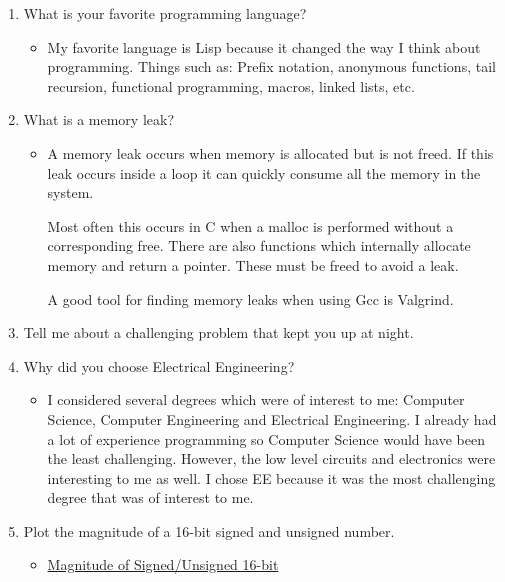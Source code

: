 \documentclass{article}
\begin{document}
\begin{enumerate}

\item What is your favorite programming language?
	\begin{itemize}
	\item My favorite language is Lisp because it changed the way I
		think about programming.  Things such as: Prefix notation,
		anonymous functions, tail recursion, functional programming,
		macros, linked lists, etc.
	\end{itemize}

\item What is a memory leak?
	\begin{itemize}
	\item A memory leak occurs when memory is allocated but is not
		freed.  If this leak occurs inside a loop it can quickly consume
		all the memory in the system.

		Most often this occurs in C when a malloc is performed without a
		corresponding free.  There are also functions which internally
		allocate memory and return a pointer.  These must be freed to
		avoid a leak.

  		A good tool for finding memory leaks when using Gcc is Valgrind.
	\end{itemize}

\item Tell me about a challenging problem that kept you up at night.

\item Why did you choose Electrical Engineering?
	\begin{itemize}
	\item I considered several degrees which were of interest to me:
		Computer Science, Computer Engineering and Electrical
		Engineering.  I already had a lot of experience programming so
		Computer Science would have been the least challenging.
		However, the low level circuits and electronics were interesting
		to me as well.  I chose EE because it was the most challenging
		degree that was of interest to me.
	\end{itemize}

\item Plot the magnitude of a 16-bit signed and unsigned number.
	\begin{itemize}
	\item \href{http://jmahler.github.io/programming/2014/01/17/sign_magnitude.html}{Magnitude of Signed/Unsigned 16-bit}
	\end{itemize}

\end{enumerate}
\end{document}

